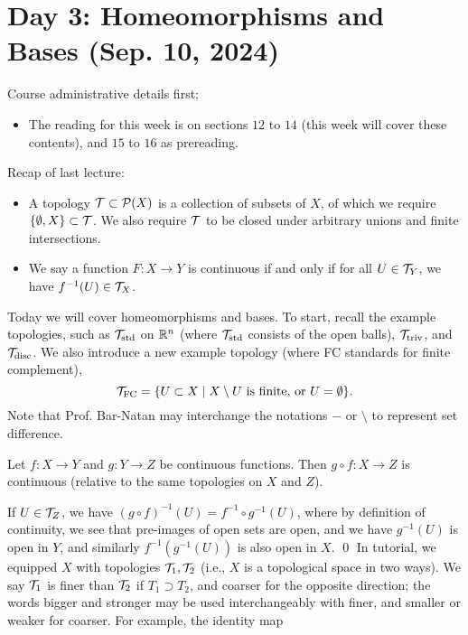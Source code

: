 \section{Day 3: Homeomorphisms and Bases (Sep. 10, 2024)}
Course administrative details first;
\begin{itemize}
    \item The reading for this week is on sections $12$ to $14$ (this week will cover these contents), and $15$ to $16$ as prereading.
\end{itemize}
Recap of last lecture:
\begin{itemize}
    \item A topology $\mathcal T \subset \mathcal P(X)$ is a collection of subsets of $X$, of which we require $\{\emptyset, X\} \subset \mathcal T$. We also require $\mathcal T$ to be closed under arbitrary unions and finite intersections.
    \item We say a function $F : X \to Y$ is continuous if and only if for all $U \in \mathcal T_Y$, we have $f^{-1}(U) \in \mathcal T_X$.
\end{itemize}
Today we will cover homeomorphisms and bases. To start, recall the example topologies, such as $\mathcal T_{\mathrm{std}}$ on $\mathbb R^n$ (where $\mathcal T_{\mathrm{std}}$ consists of the open balls), $\mathcal T_\mathrm{triv}$, and $\mathcal T_\mathrm{disc}$. We also introduce a new example topology (where FC standards for finite complement),
\[ \mathcal T_\mathrm{FC} = \{ U \subset X \mid X \setminus U \text{ is finite, or } U = \emptyset \}. \]
Note that Prof. Bar-Natan may interchange the notations $-$ or $\setminus$ to represent set difference.
\begin{simplethm}
    Let $f : X \to Y$ and $g : Y \to Z$ be continuous functions. Then $g \circ f : X \to Z$ is continuous (relative to the same topologies on $X$ and $Z$).
\end{simplethm}
\noindent If $U \in \mathcal T_Z$, we have $(g \circ f)^{-1}(U) = f^{-1} \circ g^{-1} (U)$, where by definition of continuity, we see that pre-images of open sets are open, and we have $g^{-1}(U)$ is open in $Y$, and similarly $f^{-1} (g^{-1}(U))$ is also open in $X$. \qed
\medskip\newline
\noindent In tutorial, we equipped $X$ with topologies $\mathcal T_1, \mathcal T_2$ (i.e., $X$ is a topological space in two ways). We say $\mathcal T_1$ is finer than $\mathcal T_2$ if $T_1 \supset T_2$, and coarser for the opposite direction; the words bigger and stronger may be used interchangeably with finer, and smaller or weaker for coarser. For example, the identity map
